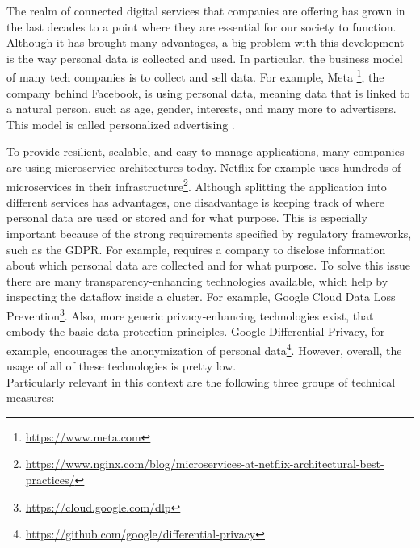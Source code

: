 

The realm of connected digital services that companies are offering has grown in the last decades to a point where they are essential for our society to function. Although it has brought many advantages, a big problem with this development is the way personal data is collected and used. In particular, the business model of many tech companies is to collect and sell data.
For example, Meta \footnote{\url{https://www.meta.com}}, the company behind Facebook, is using personal data, meaning data that is linked to a natural person, such as age, gender, interests, and many more to advertisers. This model is called personalized advertising \cite{tucker_social_2014}. 

To provide resilient, scalable, and easy-to-manage applications, many companies are using microservice architectures today. Netflix for example uses hundreds of microservices in their infrastructure\footnote{\url{https://www.nginx.com/blog/microservices-at-netflix-architectural-best-practices/}}. Although splitting the application into different services has advantages, one disadvantage is keeping track of where personal data are used or stored and for what purpose. This is especially important because of the strong requirements specified by regulatory frameworks, such as the GDPR. For example, \parencite[Art. 13]{noauthor_general_2016} requires a company to disclose information about which personal data are collected and for what purpose. 
To solve this issue there are many transparency-enhancing technologies available, which help by inspecting the dataflow inside a cluster. For example, Google Cloud Data Loss Prevention\footnote{\url{https://cloud.google.com/dlp}}.
Also, more generic privacy-enhancing technologies exist, that embody the basic data protection principles. Google Differential Privacy, for example, encourages the anonymization of personal data\footnote{\url{https://github.com/google/differential-privacy}}.
However, overall, the usage of all of these technologies is pretty low. \\

Particularly relevant in this context are the following three groups of technical measures:\\

